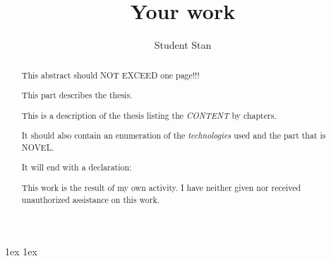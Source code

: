 \documentclass[final,a4paper]{aust_thesis}
\title{%
Your work
}
\author{%
Student Stan
}
\begin{document}
\begin{abstract}%


{ \color{gray!60!red}
	This abstract should NOT EXCEED one page!!!
	
	This part describes the thesis.

	This is a description of the thesis listing the {\em CONTENT} by chapters.

	It should also contain an enumeration of the {\em technologies} used and the part that is NOVEL.
	
	\vfill

	It will end with a declaration:
}

This work is the result of my own activity. I have neither given nor received unauthorized assistance on this work.

\end{abstract}

\maketitle


{ \baselineskip 1ex
  \parskip 1ex
  \tableofcontents
}











\appendix



{ \renewcommand{\baselinestretch}{0.8}\normalsize %
  \setlength{\itemsep}{-2.4mm}
  \setlength{\bibspacing}{0.67\baselineskip}
  
  
}
\end{document}
